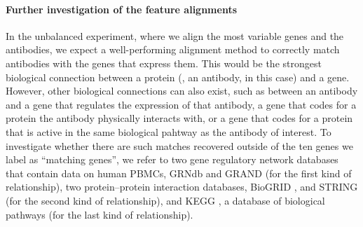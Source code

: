 \paragraph{Further investigation of the feature alignments}
In the unbalanced experiment, where we align the most variable genes and the antibodies,
we expect a well-performing alignment method to correctly match antibodies with the genes
that express them. This would be the strongest biological connection between a protein
(\ie, an antibody, in this case) and a gene. However, other biological connections can also exist,
such as between an antibody and a gene that regulates the expression of that antibody,
a gene that codes for a protein the antibody physically interacts with, or a gene that codes
for a protein that is active in the same biological pahtway as the antibody of interest.
To investigate whether there are such matches recovered outside of the ten genes we label
as ``matching genes'', we refer to two gene regulatory network databases that contain data
on human PBMCs, GRNdb \citep{GRNdb} and GRAND \citep{GRAND} (for the first kind of relationship),
two protein--protein interaction databases, BioGRID \citep{BIOGRID}, and STRING \citep{STRING}
(for the second kind of relationship), and KEGG \citep{KEGG}, a database of biological pathways
(for the last kind of relationship).

